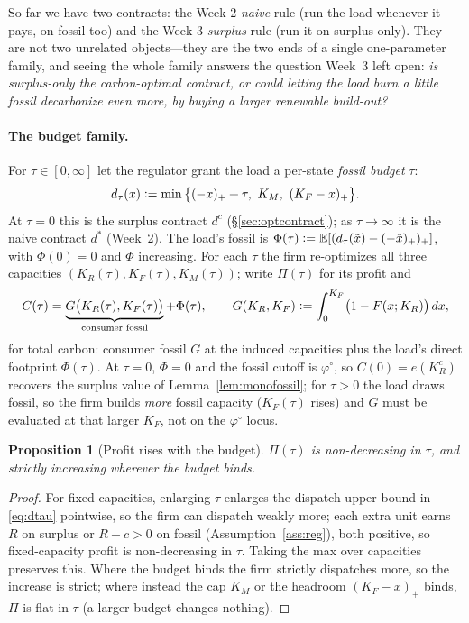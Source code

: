 \documentclass[11pt,reqno]{amsart}
\theoremstyle{plain}
\newtheorem{proposition}{Proposition}
\theoremstyle{definition}
\theoremstyle{remark}
\newcommand{\KR}{K_R}
\newcommand{\KF}{K_F}
\newcommand{\KM}{K_M}
\newcommand{\KRc}{K_R^{c}}
\newcommand{\E}{\mathbb{E}}
\newcommand{\eqdef}{\vcentcolon=}
\begin{document}
So far we have two contracts: the Week-2 \emph{naive} rule (run the load whenever it
pays, on fossil too) and the Week-3 \emph{surplus} rule (run it on surplus only). They
are not two unrelated objects---they are the two ends of a single one-parameter family,
and seeing the whole family answers the question Week~3 left open: \emph{is surplus-only
the carbon-optimal contract, or could letting the load burn a little fossil decarbonize
even more, by buying a larger renewable build-out?}

\paragraph{The budget family.} For $\tau\in[0,\infty]$ let the regulator grant the load
a per-state \emph{fossil budget} $\tau$:
\begin{equation}\label{eq:dtau}
  d_{\tau}(x)\eqdef\min\big\{(-x)_+ + \tau,\ \KM,\ (\KF-x)_+\big\}.
\end{equation}
At $\tau=0$ this is the surplus contract $d^{c}$ (\S\ref{sec:optcontract}); as
$\tau\to\infty$ it is the naive contract $d^{*}$ (Week~2). The load's fossil is
$\Phi(\tau)\eqdef\E[(d_{\tau}(\tilde x)-(-\tilde x)_+)_+]$, with $\Phi(0)=0$ and $\Phi$
increasing. For each $\tau$ the firm re-optimizes all three capacities
$(\KR(\tau),\KF(\tau),\KM(\tau))$; write $\Pi(\tau)$ for its profit and
\begin{equation}\label{eq:Ctau}
  C(\tau)=\underbrace{G\big(\KR(\tau),\KF(\tau)\big)}_{\text{consumer fossil}}+\Phi(\tau),
  \qquad G(\KR,\KF)\eqdef\int_0^{\KF}\!\big(1-F(x;\KR)\big)\,dx ,
\end{equation}
for total carbon: consumer fossil $G$ at the induced capacities plus the load's direct
footprint $\Phi(\tau)$. At $\tau=0$, $\Phi=0$ and the fossil cutoff is $\varphi^{\circ}$,
so $C(0)=e(\KRc)$ recovers the surplus value of Lemma~\ref{lem:monofossil}; for $\tau>0$
the load draws fossil, so the firm builds \emph{more} fossil capacity ($\KF(\tau)$ rises)
and $G$ must be evaluated at that larger $\KF$, not on the $\varphi^{\circ}$ locus.

\begin{proposition}[Profit rises with the budget]\label{prop:profitmono}
$\Pi(\tau)$ is non-decreasing in $\tau$, and strictly increasing wherever the budget
binds.
\end{proposition}
\begin{proof}
For fixed capacities, enlarging $\tau$ enlarges the dispatch upper bound in
\eqref{eq:dtau} pointwise, so the firm can dispatch weakly more; each extra unit earns
$R$ on surplus or $R-c>0$ on fossil (Assumption~\ref{ass:reg}), both positive, so
fixed-capacity profit is non-decreasing in $\tau$. Taking the max over capacities
preserves this. Where the budget binds the firm strictly dispatches more, so the
increase is strict; where instead the cap $\KM$ or the headroom $(\KF-x)_+$ binds, $\Pi$
is flat in $\tau$ (a larger budget changes nothing).
\end{proof}
\end{document}
